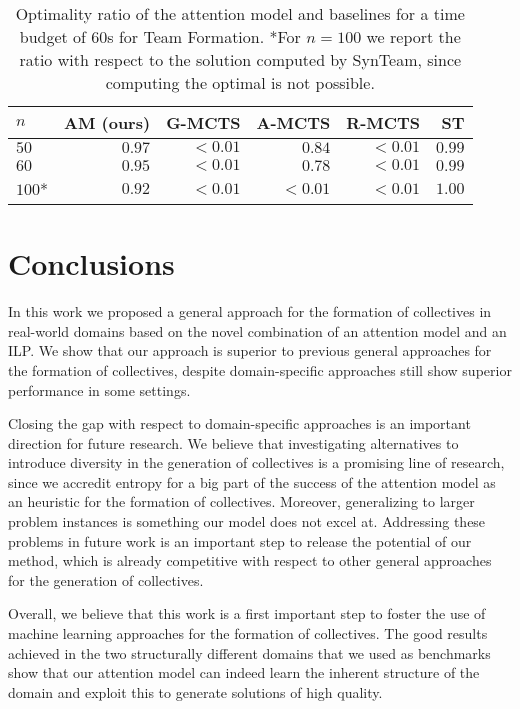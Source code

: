 \documentclass{article}
\theoremstyle{definition}
\begin{document}
\begin{table}[]
\centering
\begin{tabular}{@{}lrrrrr@{}}
\toprule
$n$ & AM (ours) & G-MCTS & A-MCTS & R-MCTS & ST \\ \midrule
$50$ & $0.97$ & $<0.01$ & $0.84$ & $<0.01$ & $0.99$ \\
$60$ & $0.95$ & $<0.01$ & $0.78$ & $<0.01$ & $0.99$ \\
$100$* & $0.92$ & $<0.01$ & $<0.01$ & $<0.01$ & $1.00$ \\ \bottomrule
\end{tabular}
\caption{Optimality ratio of the attention model and baselines for a time budget of 60s for Team Formation. *For $n = 100$ we report the ratio with respect to the solution computed by SynTeam, since computing the optimal is not possible.}
\label{tf_results}
\end{table}

\section{Conclusions}

In this work we proposed a general approach for the formation of collectives in real-world domains based on the novel combination of an attention model and an ILP. We show that our approach is superior to previous general approaches for the formation of collectives, despite domain-specific approaches still show superior performance in some settings. 

Closing the gap with respect to domain-specific approaches is an important direction for future research. We believe that investigating alternatives to introduce diversity in the generation of collectives is a promising line of research, since we accredit entropy for a big part of the success of the attention model as an heuristic for the formation of collectives. Moreover, generalizing to larger problem instances is something our model does not excel at. Addressing these problems in future work is an important step to release the potential of our method, which is already competitive with respect to other general approaches for the generation of collectives.

Overall, we believe that this work is a first important step to foster the use of machine learning approaches for the formation of collectives. The good results achieved in the two structurally different domains that we used as benchmarks show that our attention model can indeed learn the inherent structure of the domain and exploit this to generate solutions of high quality.




\end{document}

